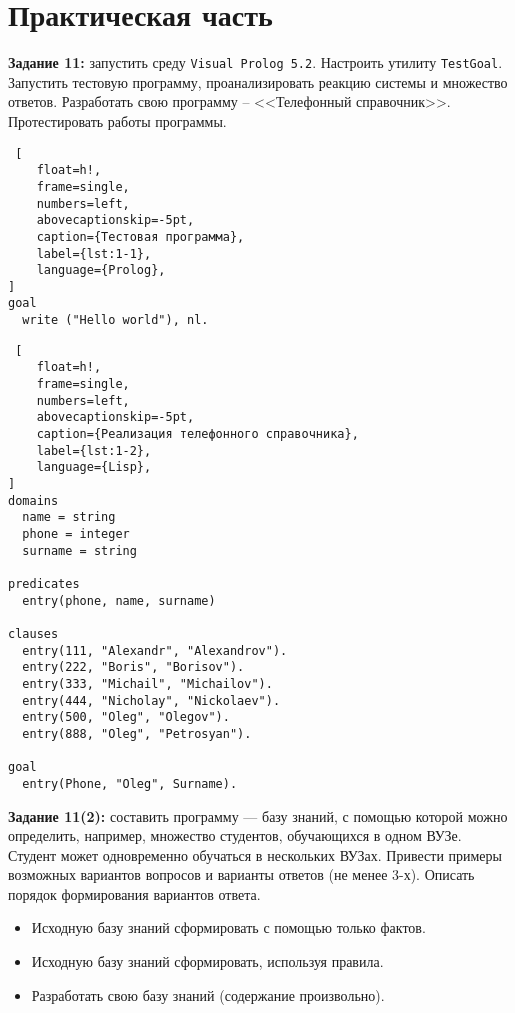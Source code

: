 \chapter{Практическая часть}

\textbf{Задание 11:} запустить среду \texttt{Visual Prolog 5.2}.  Настроить утилиту \texttt{TestGoal}. Запустить тестовую программу, проанализировать реакцию системы и множество ответов. Разработать свою программу – <<Телефонный справочник>>. Протестировать работы программы.

\begin{lstlisting} [
	float=h!,
	frame=single,
	numbers=left,
	abovecaptionskip=-5pt,
	caption={Тестовая программа},
	label={lst:1-1},
	language={Prolog},
]
goal
  write ("Hello world"), nl.
\end{lstlisting}

\begin{lstlisting} [
	float=h!,
	frame=single,
	numbers=left,
	abovecaptionskip=-5pt,
	caption={Реализация телефонного справочника},
	label={lst:1-2},
	language={Lisp},
]
domains
  name = string
  phone = integer
  surname = string
  
predicates
  entry(phone, name, surname)

clauses
  entry(111, "Alexandr", "Alexandrov").
  entry(222, "Boris", "Borisov").
  entry(333, "Michail", "Michailov").
  entry(444, "Nicholay", "Nickolaev").
  entry(500, "Oleg", "Olegov").
  entry(888, "Oleg", "Petrosyan").
  
goal
  entry(Phone, "Oleg", Surname).
\end{lstlisting}

\clearpage

\textbf{Задание 11(2):} составить программу --- базу знаний, с помощью которой можно определить, например, множество студентов, обучающихся в одном ВУЗе. Студент может одновременно обучаться в нескольких ВУЗах. Привести примеры возможных вариантов вопросов и варианты ответов (не менее 3-х). Описать порядок формирования вариантов ответа.
\begin{itemize}
    \item Исходную базу знаний сформировать с помощью только фактов.
    \item Исходную базу знаний сформировать, используя правила.
    \item Разработать свою базу знаний (содержание произвольно).
\end{itemize}

